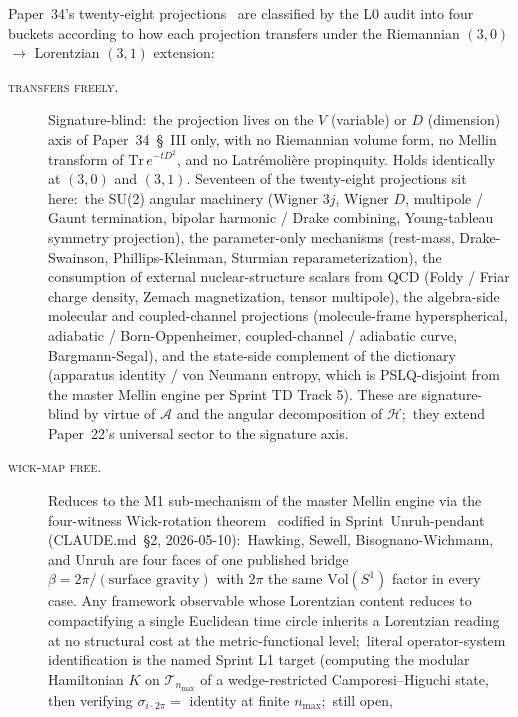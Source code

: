 \documentclass[twocolumn,pra,amsmath,amssymb,superscriptaddress]{revtex4-2}
\begin{document}
Paper~34's twenty-eight projections~\cite{paper34} are classified by
the L0 audit into four buckets according to how each projection
transfers under the Riemannian $(3, 0)$ $\to$ Lorentzian $(3, 1)$
extension:

\begin{description}
\item[\textsc{transfers freely}.]  Signature-blind:\ the projection
  lives on the $V$ (variable) or $D$ (dimension) axis of
  Paper~34~\S~III only, with no Riemannian volume form, no Mellin
  transform of $\mathrm{Tr}\,e^{-tD^2}$, and no
  Latr\'emoli\`ere propinquity.  Holds identically at $(3, 0)$ and
  $(3, 1)$.  Seventeen of the twenty-eight projections sit here:\ the
  SU(2) angular machinery (Wigner $3j$, Wigner $D$, multipole / Gaunt
  termination, bipolar harmonic / Drake combining, Young-tableau
  symmetry projection), the parameter-only mechanisms (rest-mass,
  Drake-Swainson, Phillips-Kleinman, Sturmian reparameterization), the
  consumption of external nuclear-structure scalars from QCD (Foldy /
  Friar charge density, Zemach magnetization, tensor multipole), the
  algebra-side molecular and coupled-channel projections (molecule-frame
  hyperspherical, adiabatic / Born-Oppenheimer, coupled-channel /
  adiabatic curve, Bargmann-Segal), and the state-side complement of
  the dictionary (apparatus identity / von Neumann entropy, which is
  PSLQ-disjoint from the master Mellin engine per Sprint TD Track 5).
  These are signature-blind by virtue of $\mathcal{A}$ and the angular
  decomposition of $\mathcal{H}$;\ they extend Paper~22's universal
  sector to the signature axis.
\item[\textsc{wick-map free}.]  Reduces to the M1 sub-mechanism of the
  master Mellin engine via the four-witness Wick-rotation
  theorem~\cite{hartle_hawking1976, sewell1982,
    bisognano_wichmann1976, unruh1976} codified in
  Sprint~Unruh-pendant (CLAUDE.md~\S2, 2026-05-10):\ Hawking, Sewell,
  Bisognano-Wichmann, and Unruh are four faces of one published
  bridge $\beta = 2\pi / (\text{surface gravity})$ with $2\pi$ the
  same $\mathrm{Vol}(S^1)$ factor in every case.  Any framework
  observable whose Lorentzian content reduces to compactifying a
  single Euclidean time circle inherits a Lorentzian reading at no
  structural cost at the metric-functional level;\ literal
  operator-system identification is the named Sprint L1 target
  (computing the modular Hamiltonian $K$ on $\mathcal{T}_{n_{\max}}$
  of a wedge-restricted Camporesi--Higuchi state, then verifying
  $\sigma_{i \cdot 2\pi} = $ identity at finite $n_{\max}$;\ still open,

\end{description}
\end{document}
